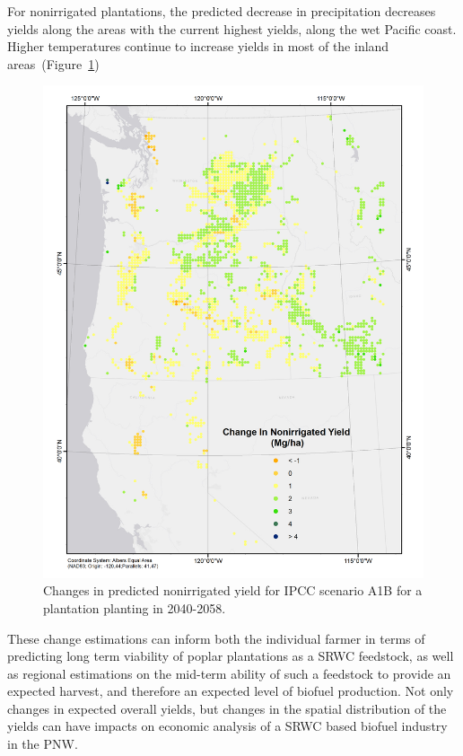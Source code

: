 \documentclass[preprint,12pt]{elsarticle}
\begin{document}
For nonirrigated plantations, the predicted decrease in precipitation
decreases yields along the areas with the current highest yields,
along the wet Pacific coast.  Higher temperatures continue to increase
yields in most of the inland areas~(Figure~\ref{fig:new_nonirrigated})

\begin{figure}[hp]
  \centering
  \includegraphics[width=1\linewidth]{climate_nonirrigated}
  \caption{Changes in predicted nonirrigated yield for \ac{IPCC} scenario A1B
    for a plantation planting in 2040-2058.}
  \label{fig:new_nonirrigated}
\end{figure}

These change estimations can inform both the individual farmer in terms of
predicting long term viability of poplar plantations as a \ac{SRWC}
feedstock, as well as regional estimations on the mid-term ability of
such a feedstock to provide an expected harvest, and therefore an
expected level of biofuel production.  Not only changes in expected
overall yields, but changes in the spatial distribution of the yields
can have impacts on economic analysis of a \ac{SRWC} based biofuel
industry in the \ac{PNW}.  
\end{document}
